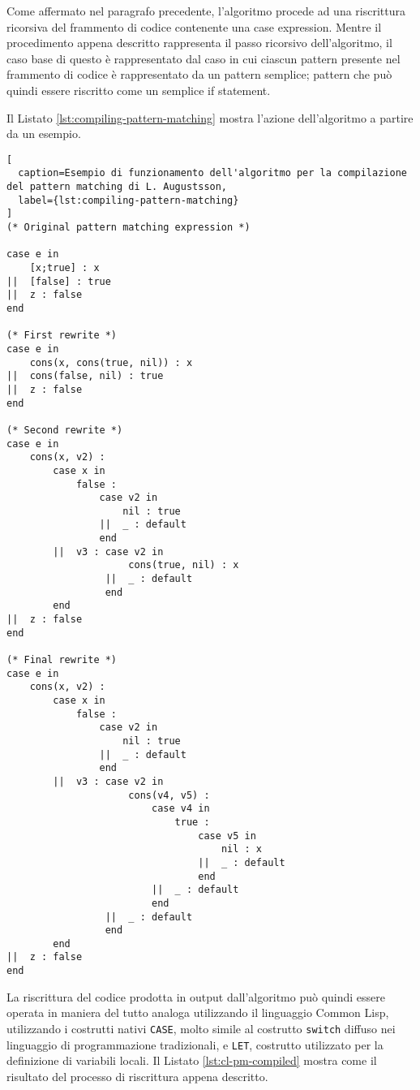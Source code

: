 Come affermato nel paragrafo precedente, l'algoritmo procede ad una riscrittura
ricorsiva del frammento di codice contenente una case expression. Mentre il
procedimento appena descritto rappresenta il passo ricorsivo dell'algoritmo, il
caso base di questo è rappresentato dal caso in cui ciascun pattern presente nel
frammento di codice è rappresentato da un pattern semplice; pattern che può
quindi essere riscritto come un semplice if statement.

Il Listato \ref{lst:compiling-pattern-matching} mostra l'azione dell'algoritmo a
partire da un esempio.

\begin{lstlisting}[
  caption=Esempio di funzionamento dell'algoritmo per la compilazione del pattern matching di L. Augustsson,
  label={lst:compiling-pattern-matching}
]
(* Original pattern matching expression *)

case e in
    [x;true] : x
||  [false] : true
||  z : false
end

(* First rewrite *)
case e in
    cons(x, cons(true, nil)) : x
||  cons(false, nil) : true
||  z : false
end

(* Second rewrite *)
case e in
    cons(x, v2) :
        case x in
            false :
                case v2 in
                    nil : true
                ||  _ : default
                end
        ||  v3 : case v2 in
                     cons(true, nil) : x
                 ||  _ : default
                 end
        end
||  z : false
end

(* Final rewrite *)
case e in
    cons(x, v2) :
        case x in
            false :
                case v2 in
                    nil : true
                ||  _ : default
                end
        ||  v3 : case v2 in
                     cons(v4, v5) :
                         case v4 in
                             true :
                                 case v5 in
                                     nil : x
                                 ||  _ : default
                                 end
                         ||  _ : default
                         end
                 ||  _ : default
                 end
        end
||  z : false
end
\end{lstlisting}

La riscrittura del codice prodotta in output dall'algoritmo può quindi essere
operata in maniera del tutto analoga utilizzando il linguaggio Common Lisp,
utilizzando i costrutti nativi \texttt{CASE}, molto simile al costrutto
\texttt{switch} diffuso nei linguaggio di programmazione tradizionali, e
\texttt{LET}, costrutto utilizzato per la definizione di variabili locali. Il
Listato \ref{lst:cl-pm-compiled} mostra come il risultato del processo di
riscrittura appena descritto.

